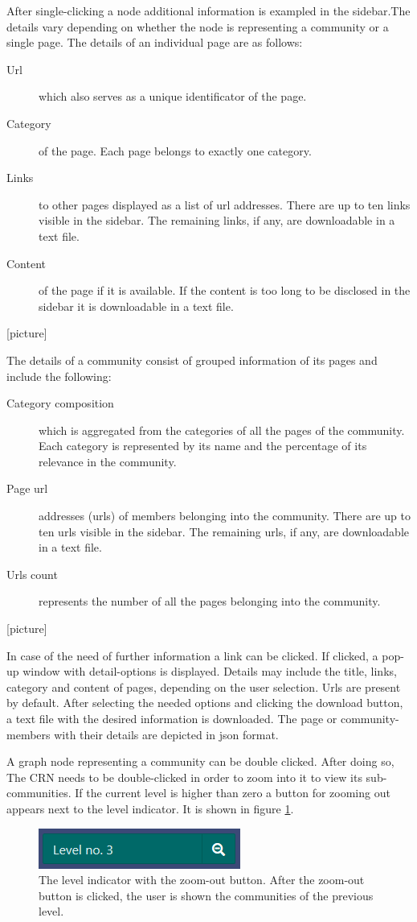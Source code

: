After single-clicking a node additional information is exampled in the sidebar.The details vary depending on whether the node is representing a community or a single page.  
The details of an individual page are as follows: 
\begin {description}
	\item [Url] which also serves as a unique identificator of the page. 
	\item [Category] of the page. Each page belongs to exactly one category.
	\item[Links] to other pages displayed as a list of url addresses. There are up to ten links visible in the sidebar. The remaining links, if any, are downloadable in a text file. 
	\item[Content] of the page if it is available. If the content is too long to be disclosed in the sidebar it is downloadable in a text file.
\end{description}
[picture]

The details of a community consist of  grouped information of its pages and include the following:
\begin {description}
	\item [Category composition] which is aggregated from the categories of all the pages of the community. Each category is represented by its name and the percentage of its relevance in the community.
	\item [Page url] addresses (urls) of members belonging into the community. There are up to ten urls visible in the sidebar. The remaining urls, if any, are downloadable in a text file. 
	\item[Urls count]represents the number of all the pages belonging into the community. 
\end{description}
[picture]

In case of the need of further information a link can be clicked. If clicked, a pop-up window with detail-options is displayed. Details may include the title, links, category and content of pages, depending on the user selection. Urls are present by default.  After selecting the needed options and clicking the download button, a text file with the desired information is downloaded. The page or community-members with their details are depicted in json format.

A graph node representing a community can be double clicked. After doing so,  The CRN needs to be double-clicked in order to zoom into it to view its sub-communities. If the current level is higher than zero a button for zooming out appears next to the level indicator. It is shown in figure \ref{levelIndicatorWithButton}.
\begin{figure}[ht!]
  \centering
  \includegraphics{Images/levelIndicatorWithButton.png}
  \caption{The level indicator with the zoom-out button. After the zoom-out button is clicked, the user is shown the communities of the previous level.}
  \label{levelIndicatorWithButton}
\end{figure} 


